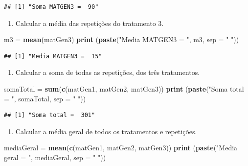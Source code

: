 \documentclass[
]{article}
\newenvironment{Shaded}{\begin{snugshade}}{\end{snugshade}}
\newcommand{\DataTypeTok}[1]{\textcolor[rgb]{0.13,0.29,0.53}{#1}}
\newcommand{\KeywordTok}[1]{\textcolor[rgb]{0.13,0.29,0.53}{\textbf{#1}}}
\newcommand{\NormalTok}[1]{#1}
\newcommand{\StringTok}[1]{\textcolor[rgb]{0.31,0.60,0.02}{#1}}
\providecommand{\tightlist}{%
  \setlength{\itemsep}{0pt}\setlength{\parskip}{0pt}}
\begin{document}
\begin{verbatim}
## [1] "Soma MATGEN3 =  90"
\end{verbatim}

\begin{enumerate}
\def\labelenumi{\arabic{enumi}.}
\setcounter{enumi}{6}
\tightlist
\item
  Calcular a média das repetições do tratamento 3.
\end{enumerate}

\begin{Shaded}
\begin{Highlighting}[]
\NormalTok{m3 =}\StringTok{ }\KeywordTok{mean}\NormalTok{(matGen3)}
\KeywordTok{print}\NormalTok{ (}\KeywordTok{paste}\NormalTok{(}\StringTok{"Media MATGEN3 = "}\NormalTok{, m3, }\DataTypeTok{sep =} \StringTok{" "}\NormalTok{))}
\end{Highlighting}
\end{Shaded}

\begin{verbatim}
## [1] "Media MATGEN3 =  15"
\end{verbatim}

\begin{enumerate}
\def\labelenumi{\arabic{enumi}.}
\setcounter{enumi}{7}
\tightlist
\item
  Calcular a soma de todas as repetições, dos três tratamentos.
\end{enumerate}

\begin{Shaded}
\begin{Highlighting}[]
\NormalTok{somaTotal =}\StringTok{ }\KeywordTok{sum}\NormalTok{(}\KeywordTok{c}\NormalTok{(matGen1, matGen2, matGen3))}
\KeywordTok{print}\NormalTok{ (}\KeywordTok{paste}\NormalTok{(}\StringTok{"Soma total = "}\NormalTok{, somaTotal, }\DataTypeTok{sep =} \StringTok{" "}\NormalTok{))}
\end{Highlighting}
\end{Shaded}

\begin{verbatim}
## [1] "Soma total =  301"
\end{verbatim}

\begin{enumerate}
\def\labelenumi{\arabic{enumi}.}
\setcounter{enumi}{8}
\tightlist
\item
  Calcular a média geral de todos os tratamentos e repetições.
\end{enumerate}

\begin{Shaded}
\begin{Highlighting}[]
\NormalTok{mediaGeral =}\StringTok{ }\KeywordTok{mean}\NormalTok{(}\KeywordTok{c}\NormalTok{(matGen1, matGen2, matGen3))}
\KeywordTok{print}\NormalTok{ (}\KeywordTok{paste}\NormalTok{(}\StringTok{"Media geral = "}\NormalTok{, mediaGeral, }\DataTypeTok{sep =} \StringTok{" "}\NormalTok{))}
\end{Highlighting}
\end{Shaded}
\end{document}
